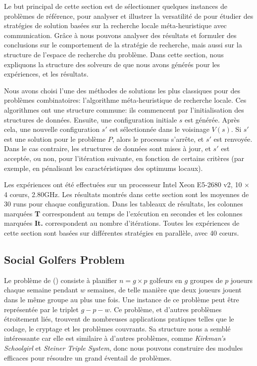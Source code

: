 
Le but principal de cette section est de sélectionner quelques instances de problèmes de référence, pour analyser et illustrer la versatilité de \posl{} pour étudier des stratégies de solution basées sur la recherche locale méta-heuristique avec communication. Grâce à \posl{} nous pouvons analyser des résultats et formuler des conclusions sur le comportement de la stratégie de recherche, mais aussi sur la structure de l'espace de recherche du problème. Dans cette section, nous expliquons la structure des  solveurs de \posl{} que nous avons générés pour les expériences, et les résultats.

Nous avons choisi l'une des méthodes de solutions les plus classiques pour des problèmes combinatoires: l'algorithme méta-heuristique de recherche locale. Ces algorithmes ont une structure commune: ils commencent par l'initialisation des structures de données. Ensuite, une configuration initiale $s$ est générée. Après cela, une nouvelle configuration $s'$ est sélectionnée dans le voisinage $V \left(s \right) $. Si $s'$ est une solution pour le problème $P$, alors le processus s'arrête, et $s'$ est renvoyée. Dans le cas contraire, les structures de données sont mises à jour, et $s'$ est acceptée, ou non, pour l'itération suivante, en fonction de certains critères (par exemple, en pénalisant les caractéristiques des optimums locaux).

Les expériences ont été effectuées sur un processeur Intel \R{} Xeon \TM{} E5-2680 v2, 10 $\times$ 4 c\oe urs, 2.80GHz. Les résultats montrés dans cette section sont les moyennes de 30 runs pour chaque configuration. Dans les tableaux de résultats, les colonnes marquées {\bf T} correspondent au temps de l'exécution en secondes et les colonnes marquées {\bf It.} correspondent au nombre d'itérations. Toutes les expériences de cette section sont basées sur différentes stratégies en parallèle, avec 40 c\oe urs.

\subsection{Social Golfers Problem}

Le problème de \sg{} (\SGP) consiste à planifier $n = g \times p$ golfeurs en $g$ groupes de $p$ joueurs chaque semaine pendant $w$ semaines, de telle manière que deux joueurs jouent dans le même groupe au plus une fois. Une instance de ce problème peut être représentée par le triplet $g-p-w$. Ce problème, et d'autres problèmes étroitement liés, trouvent de nombreuses applications pratiques telles que le codage, le cryptage et les problèmes couvrants. Sa structure nous a semblé intéressante car elle est similaire à d'autres problèmes, comme {\it Kirkman's Schoolgirl} et {\it Steiner Triple System}, donc nous pouvons construire des modules efficaces pour résoudre un grand éventail de problèmes.

